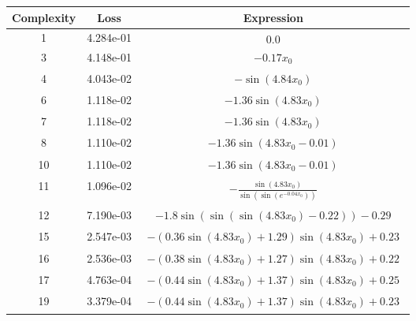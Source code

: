 \begin{center}
        \begin{tabular}{|c|c|c|}
        \hline
        Complexity & Loss & Expression \\
        \hline
        1 & 4.284e-01 & $\begin{aligned}0.0\end{aligned}$\\ \hline3 & 4.148e-01 & $\begin{aligned}- 0.17 x_{0}\end{aligned}$\\ \hline4 & 4.043e-02 & $\begin{aligned}- \sin{\left(4.84 x_{0} \right)}\end{aligned}$\\ \hline6 & 1.118e-02 & $\begin{aligned}- 1.36 \sin{\left(4.83 x_{0} \right)}\end{aligned}$\\ \hline7 & 1.118e-02 & $\begin{aligned}- 1.36 \sin{\left(4.83 x_{0} \right)}\end{aligned}$\\ \hline8 & 1.110e-02 & $\begin{aligned}- 1.36 \sin{\left(4.83 x_{0} - 0.01 \right)}\end{aligned}$\\ \hline10 & 1.110e-02 & $\begin{aligned}- 1.36 \sin{\left(4.83 x_{0} - 0.01 \right)}\end{aligned}$\\ \hline11 & 1.096e-02 & $\begin{aligned}- \frac{\sin{\left(4.83 x_{0} \right)}}{\sin{\left(\sin{\left(e^{- 0.04 x_{0}} \right)} \right)}}\end{aligned}$\\ \hline12 & 7.190e-03 & $\begin{aligned}- 1.8 \sin{\left(\sin{\left(\sin{\left(4.83 x_{0} \right)} - 0.22 \right)} \right)} - 0.29\end{aligned}$\\ \hline15 & 2.547e-03 & $\begin{aligned}- \left(0.36 \sin{\left(4.83 x_{0} \right)} + 1.29\right) \sin{\left(4.83 x_{0} \right)} + 0.23\end{aligned}$\\ \hline16 & 2.536e-03 & $\begin{aligned}- \left(0.38 \sin{\left(4.83 x_{0} \right)} + 1.27\right) \sin{\left(4.83 x_{0} \right)} + 0.22\end{aligned}$\\ \hline17 & 4.763e-04 & $\begin{aligned}- \left(0.44 \sin{\left(4.83 x_{0} \right)} + 1.37\right) \sin{\left(4.83 x_{0} \right)} + 0.25\end{aligned}$\\ \hline19 & 3.379e-04 & $\begin{aligned}- \left(0.44 \sin{\left(4.83 x_{0} \right)} + 1.37\right) \sin{\left(4.83 x_{0} \right)} + 0.23\end{aligned}$\\ 
\end{tabular}
\end{center}
